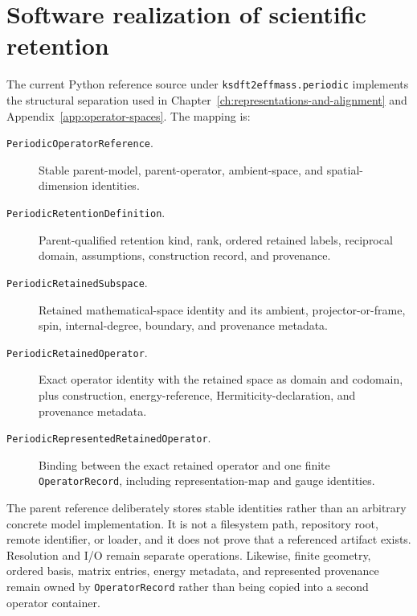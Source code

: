 
\section{Software realization of scientific retention}


The current Python reference source under \texttt{ksdft2effmass.periodic}
implements the structural separation used in
Chapter~\ref{ch:representations-and-alignment} and
Appendix~\ref{app:operator-spaces}. The mapping is:

\begin{description}
  \item[\texttt{PeriodicOperatorReference}.] Stable parent-model,
    parent-operator, ambient-space, and spatial-dimension identities.
  \item[\texttt{PeriodicRetentionDefinition}.] Parent-qualified retention
    kind, rank, ordered retained labels, reciprocal domain, assumptions,
    construction record, and provenance.
  \item[\texttt{PeriodicRetainedSubspace}.] Retained mathematical-space
    identity and its ambient, projector-or-frame, spin, internal-degree,
    boundary, and provenance metadata.
  \item[\texttt{PeriodicRetainedOperator}.] Exact operator identity with the
    retained space as domain and codomain, plus construction,
    energy-reference, Hermiticity-declaration, and provenance metadata.
  \item[\texttt{PeriodicRepresentedRetainedOperator}.] Binding between the
    exact retained operator and one finite \texttt{OperatorRecord}, including
    representation-map and gauge identities.
\end{description}

The parent reference deliberately stores stable identities rather than an
arbitrary concrete model implementation. It is not a filesystem path,
repository root, remote identifier, or loader, and it does not prove that a
referenced artifact exists. Resolution and I/O remain separate operations.
Likewise, finite geometry, ordered basis, matrix entries, energy metadata, and
represented provenance remain owned by \texttt{OperatorRecord} rather than
being copied into a second operator container.


